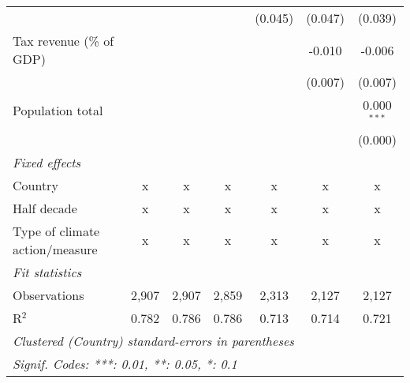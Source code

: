 \begin{tabular}{lcccccc}
                                                       &               &               &                & (0.045)      & (0.047)       & (0.039)\\   
   Tax revenue (\% of GDP)                             &               &               &                &              & -0.010        & -0.006\\   
                                                       &               &               &                &              & (0.007)       & (0.007)\\   
   Population total                                    &               &               &                &              &               & 0.000$^{***}$\\   
                                                       &               &               &                &              &               & (0.000)\\   
   \emph{Fixed effects}\\
   Country                                             & x             & x             & x              & x            & x             & x\\  
   Half decade                                         & x             & x             & x              & x            & x             & x\\  
   Type of climate action/measure                      & x             & x             & x              & x            & x             & x\\  
   \midrule \emph{Fit statistics}\\
   Observations                                        & 2,907         & 2,907         & 2,859          & 2,313        & 2,127         & 2,127\\  
   R$^2$                                               & 0.782         & 0.786         & 0.786          & 0.713        & 0.714         & 0.721\\  
   \midrule
   \multicolumn{7}{l}{\emph{Clustered (Country) standard-errors in parentheses}}\\
   \multicolumn{7}{l}{\emph{Signif. Codes: ***: 0.01, **: 0.05, *: 0.1}}\\
\end{tabular}
\par\endgroup


